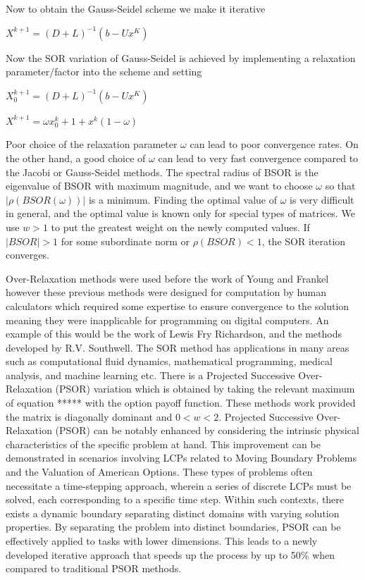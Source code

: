 \documentclass[11pt]{article}
\begin{document}
Now to obtain the Gauss-Seidel scheme we make it iterative

$X^{k+1} = (D+L)^{-1}(b-Ux^K)$

Now the SOR variation of  Gauss-Seidel is achieved by implementing a relaxation parameter/factor into the scheme and setting 

$X_0^{k+1}=(D+L)^{-1}(b-Ux^K)$

$X^{k+1} = \omega x_0^k+1+x^k(1-\omega)$

Poor choice of the relaxation parameter $\omega$ can lead to poor convergence rates. On the other hand, a good choice of $\omega$ can lead to very fast convergence compared to the Jacobi or Gauss-Seidel methods. The spectral radius of BSOR is the eigenvalue of BSOR with maximum magnitude, and we want to choose $\omega$ so that $|\rho(BSOR (\omega))|$ is a minimum. Finding the optimal value of $\omega$ is very difficult in general, and the optimal value is known only for special types of matrices.
We use $w>1$ to put the greatest weight on the newly computed values. If $\vert BSOR \vert>1$ for some subordinate norm or $\rho(BSOR)<1$, the SOR iteration converges. 

Over-Relaxation methods were used before the work of Young and Frankel however these previous methods were designed for computation by human calculators which required some expertise to ensure convergence to the solution meaning they were inapplicable for programming on digital computers. An example of this would be the work of Lewis Fry Richardson, and the methods developed by R.V. Southwell. The SOR method has applications in many areas such as computational fluid dynamics, mathematical programming, medical analysis, and machine learning etc.
There is a Projected  Successive Over-Relaxation (PSOR) variation which is obtained by taking the relevant maximum of equation ***** with the option payoff function. These methods work provided the matrix is diagonally dominant and $0 < w < 2$.  Projected Successive Over-Relaxation (PSOR) can be notably enhanced by considering the intrinsic physical characteristics of the specific problem at hand. This improvement can be demonstrated in scenarios involving LCPs related to Moving Boundary Problems and the Valuation of American Options. These types of problems often necessitate a time-stepping approach, wherein a series of discrete LCPs must be solved, each corresponding to a specific time step. Within such contexts, there exists a dynamic boundary separating distinct domains with varying solution properties. By separating the problem into distinct boundaries, PSOR can be effectively applied to tasks with lower dimensions. This leads to a newly developed iterative approach that speeds up the process by up to 50\% when compared to traditional PSOR methods.
\end{document}

